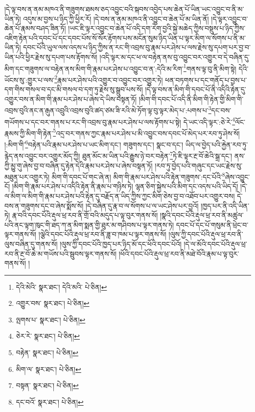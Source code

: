 །དེ་ལྟ་བས་ན་ནམ་མཁའ་ནི་གཟུགས་ཐམས་ཅད་འབྱུང་བའི་སྐབས་འབྱེད་པས་ཆེན་པོ་ཡིན་ཡང་འབྱུང་བ་ནི་མ་ཡིན་ཏེ། འདུས་མ་བྱས་པ་ཉིད་ཀྱི་ཕྱིར་རོ། །དེ་བས་ན་ནམ་མཁའ་ནི་འབྱུང་བ་ཆེན་པོ་མ་ཡིན་ནོ། །དེ་ལྟར་འབྱུང་བ་ཆེན་པོ་རྣམས་བཤད་ཟིན་ཏོ། །ཡང་ཇི་ལྟར་འབྱུང་བ་ཆེན་པོ་འདི་དག་རེག་བྱའི་སྐྱེ་མཆེད་ཀྱིས་བསྡུས་པ་ཉིད་ཀྱིས་འཇིག་རྟེན་པའི་དབང་པོ་དང་དབང་པོས་སོ་སོར་རྟོགས་པས་མངོན་སུམ་ཉིད་ཡིན་པ་ལྟར་མིག་ལ་སོགས་པ་ནི་མ་ཡིན་ཏེ། དབང་པོའི་ཡུལ་ལས་འདས་པ་ཉིད་ཀྱིས་ན་རང་གི་འབྲས་བུ་རྣམ་པར་ཤེས་པ་ལས་རྗེས་སུ་དཔག་པར་བྱ་བ་ཡིན་པའི་ཕྱིར་རྗེས་སུ་དཔག་པས་རྟོགས་སོ། །འདི་ལྟར་མ་དང་ཕ་ལ་བརྟེན་ནས་བུ་འབྱུང་བར་འགྱུར་བ་དེ་བཞིན་དུ་མིག་དང་གཟུགས་ལ་བརྟེན་ནས་མིག་གི་རྣམ་པར་ཤེས་པ་འབྱུང་བ་ན་:དེའི་མ་རིག་\footnote{དེའི་མེའི་  སྣར་ཐང་། དེའི་མའི་  པེ་ཅིན། }གནས་ལྟ་བུ་ནི་མིག་སྟེ། དེའི་ཡོངས་སུ་:གྱུར་པ་ལས་\footnote{འགྱུར་བས་  སྣར་ཐང་།  པེ་ཅིན། }རྣམ་པར་ཤེས་པའི་འགྱུར་བ་འབྱུང་བར་འགྱུར་ཏེ། ཕན་བཏགས་པ་དང་གནོད་པ་བྱས་པ་དག་གིས་གསལ་བ་དང་མི་གསལ་བ་དག་ཏུ་རྗེས་སུ་སྒྲུབ་པས་སོ། །དེ་ལྟ་བས་ན་མིག་གི་དབང་པོ་ནི་འདིའི་རྟེན་དུ་འགྱུར་བས་ན་མིག་གི་རྣམ་པར་ཤེས་པ་ཞེས་དེ་ཡིས་བསྟན་ཏོ། །མིག་གི་དབང་པོ་འདི་ནི་མིག་གི་རྟེན་གྱི་མིག་གི་འབྲས་བུའི་ནང་ན་རྒུན་འབྲུའི་འབྲས་བུའི་ཚད་ཙམ་ཟི་རའི་མེ་ཏོག་ལྟ་བུ་ལྟར་མེད་པ་:པགས་པ་\footnote{ལྤགས་པ་  སྣར་ཐང་།  པེ་ཅིན། }དང་བས་གཡོགས་པ་དང་བར་གནས་པ་རང་གི་འབྲས་བུ་རྣམ་པར་ཤེས་པ་ལས་རྟོགས་པ་སྟེ། དེ་ཡང་འདི་ལྟར་:ཅེ་རེ་\footnote{ཅེར་རེ་  སྣར་ཐང་།  པེ་ཅིན། }ལོང་རྣམས་ཀྱི་མིག་གི་རྟེན་\footnote{བརྟེན་  སྣར་ཐང་།  པེ་ཅིན། }འདྲ་བར་གནས་ཀྱང་རྣམ་པར་ཤེས་པ་མི་འབྱུང་བས་དབང་པོ་མེད་པར་རབ་ཏུ་ཤེས་སོ། །:མིག་གི་\footnote{མིག་ལ་  སྣར་ཐང་།  པེ་ཅིན། }བརྟེན་པའི་རྣམ་པར་ཤེས་པ་ཡང་མིག་དང་། གཟུགས་དང་། སྣང་བ་དང་། ཡིད་ལ་བྱེད་པའི་རྐྱེན་རབ་ཏུ་རྙེད་ནས་འབྱུང་བར་འགྱུར་མོད་ཀྱི། ཐུན་མོང་མ་ཡིན་པའི་རྒྱུས་ཉེ་བར་བརྟེན་\footnote{བསྟན་  སྣར་ཐང་།  པེ་ཅིན། }ཏེ་ཇི་ལྟར་རྔ་བོ་ཆེའི་སྒྲ་དང་། ནས་ཀྱི་མྱུ་གུ་ཞེས་བྱ་བ་བཞིན་དུ་རྟེན་དེའི་རྣམ་པར་ཤེས་པ་ཞེས་བསྟན་ཏོ། །རབ་ཏུ་བྱེད་པའི་གཞུང་དང་ཡང་རྗེས་སུ་མཐུན་པར་འགྱུར་ཏེ། མིག་གི་དབང་པོ་གང་ཞེ་ན། མིག་གི་རྣམ་པར་ཤེས་པའི་རྟེན་གཟུགས་:དང་པོའི་\footnote{དང་བའོ་  སྣར་ཐང་།  པེ་ཅིན། }ཞེས་འབྱུང་ངོ། །མིག་གི་རྣམ་པར་ཤེས་པ་འདིའི་རྟེན་ནི་རྣམ་པ་གཉིས་ཏེ། ལྷན་ཅིག་སྐྱེས་པའི་མིག་དང་འདས་པའི་ཡིད་དོ། །དེ་ལ་མིག་ལ་མིག་གི་རྣམ་པར་ཤེས་པའི་རྟེན་དུ་བརྗོད་ན་ཡིད་ཀྱིས་ཀྱང་མིག་ཅེས་བྱ་བ་འཐོབ་པར་འགྱུར་བས། དེ་བས་ན་གཟུགས་དང་བ་ཞེས་སྨོས་སོ། །དེ་བཞིན་དུ་རྣ་བ་ལ་སོགས་པ་ལ་ཡང་ཤེས་པར་བྱའོ། །ཁྱད་པར་ནི་འདི་ཡིན་ཏེ། རྣ་བའི་དབང་པོའི་རྡུལ་ཕྲ་རབ་ནི་གྲོ་བའི་མདུད་པ་ལྟ་བུར་གནས་སོ། །སྣའི་དབང་པོའི་རྡུལ་ཕྲ་རབ་ནི་མཚུལ་པའི་ནང་ལྟག་ཁུང་གི་ཐད་ཀ་ན་མིག་སྨན་གྱི་ཐུར་མ་གཤིབས་པ་ལྟར་གནས་ཏེ། དབང་པོ་དང་པོ་གསུམ་ནི་ཕྲེང་བ་ལྟར་གནས་སོ། །ལྕེའི་དབང་པོའི་རྡུལ་ཕྲ་རབ་ནི་ཟླ་བ་ཁམ་པ་ལྟར་གནས་སོ། །ལུས་ཀྱི་དབང་པོའི་རྡུལ་ཕྲ་རབ་ནི་ལུས་བཞིན་དུ་གནས་སོ། །ལུས་ཀྱི་དབང་པོའི་ཁྱད་པར་ཉིད་མོ་དང་ཕོའི་དབང་པོའོ། །དེ་ལ་མོའི་དབང་པོའི་རྡུལ་ཕྲ་རབ་ནི་རྔ་བོ་ཆེ་མ་གཡོས་པའི་སྦུབས་ལྟར་གནས་སོ། །ཕོའི་དབང་པོའི་རྡུལ་ཕྲ་རབ་ནི་མཐེ་བོའི་རྣམ་པ་ལྟ་བུར་གནས་སོ། །
